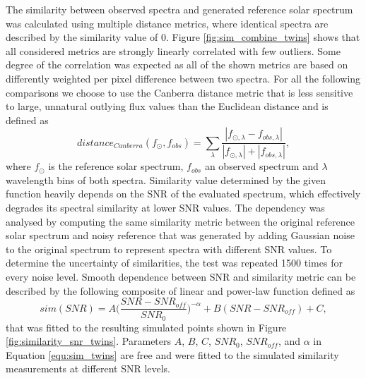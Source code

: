 The similarity between observed spectra and generated reference solar spectrum was calculated using multiple distance metrics, where identical spectra are described by the similarity value of 0. Figure \ref{fig:sim_combine_twins} shows that all considered metrics are strongly linearly correlated with few outliers. Some degree of the correlation was expected as all of the shown metrics are based on differently weighted per pixel difference between two spectra. For all the following comparisons we choose to use the Canberra distance metric \cite{Lance1967MixedDataCP} that is less sensitive to large, unnatural outlying flux values than the Euclidean distance and is defined as 
\begin{equation}
	\label{equ:equ_canberra}
	distance_{Canberra}(f_{\odot}, f_{obs}) = \sum_{\lambda}^{\ } \frac{|f_{\odot,\lambda} - f_{obs,\lambda}|}{|f_{\odot,\lambda}| + |f_{obs,\lambda}|},
\end{equation}
where $f_{\odot}$ is the reference solar spectrum, $f_{obs}$ an observed spectrum and $\lambda$ wavelength bins of both spectra. Similarity value determined by the given function heavily depends on the SNR of the evaluated spectrum, which effectively degrades its spectral similarity at lower SNR values. The dependency was analysed by computing the same similarity metric between the original reference solar spectrum and noisy reference that was generated by adding Gaussian noise to the original spectrum to represent spectra with different SNR values. To determine the uncertainty of similarities, the test was repeated 1500 times for every noise level. Smooth dependence between SNR and similarity metric can be described by the following composite of linear and power-law function defined as
\begin{equation}
	\label{equ:sim_twins}
	sim(SNR) = A \Big(\frac{SNR-SNR_{off}}{SNR_0}\Big)^{-\alpha} + B (SNR-SNR_{off}) + C,
\end{equation}
that was fitted to the resulting simulated points shown in Figure \ref{fig:similarity_snr_twins}. Parameters $A$, $B$, $C$, $SNR_0$, $SNR_{off}$, and $\alpha$ in Equation \ref{equ:sim_twins} are free and were fitted to the simulated similarity measurements at different SNR levels.

